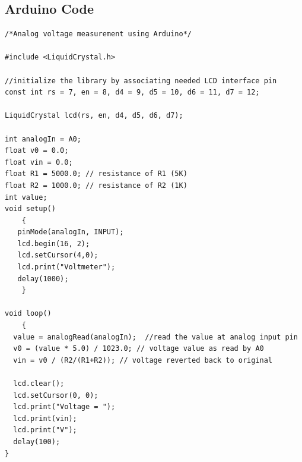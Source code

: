 \pagebreak\subsection{Arduino Code}
    \begin{lstlisting}[style = Arduino]
/*Analog voltage measurement using Arduino*/

#include <LiquidCrystal.h>

//initialize the library by associating needed LCD interface pin
const int rs = 7, en = 8, d4 = 9, d5 = 10, d6 = 11, d7 = 12;

LiquidCrystal lcd(rs, en, d4, d5, d6, d7);

int analogIn = A0;
float v0 = 0.0;
float vin = 0.0;
float R1 = 5000.0; // resistance of R1 (5K) 
float R2 = 1000.0; // resistance of R2 (1K) 
int value;
void setup()
	{
   pinMode(analogIn, INPUT);
   lcd.begin(16, 2);
   lcd.setCursor(4,0);
   lcd.print("Voltmeter");
   delay(1000);
  	}

void loop()
	{
  value = analogRead(analogIn);  //read the value at analog input pin
  v0 = (value * 5.0) / 1023.0; // voltage value as read by A0
  vin = v0 / (R2/(R1+R2)); // voltage reverted back to original

  lcd.clear();
  lcd.setCursor(0, 0);
  lcd.print("Voltage = ");
  lcd.print(vin);
  lcd.print("V");
  delay(100);
}
    \end{lstlisting}